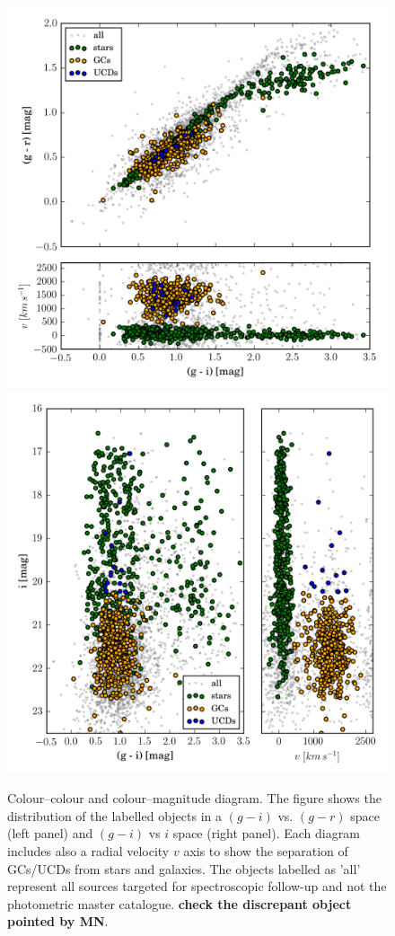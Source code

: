 \documentclass[useAMS,usenatbib]{mn2e}
\begin{document}
\begin{figure}
\centering
\includegraphics[width=\columnwidth]{figures/cc.png} 
\includegraphics[width=\columnwidth]{figures/cm.png} 
\caption{Colour--colour and colour--magnitude diagram. The figure shows the distribution of the labelled objects in a $(g-i)$ vs. $(g-r)$ space (left panel) and $(g-i)$ vs $i$ space (right panel). Each diagram includes also a radial velocity $v$ axis to show the separation of GCs/UCDs from stars and galaxies. The objects labelled as 'all' represent all sources targeted for spectroscopic follow-up and not the photometric master catalogue. {\bf check the discrepant object pointed by MN}. }
\label{fig:cc}
\end{figure}
\end{document}
